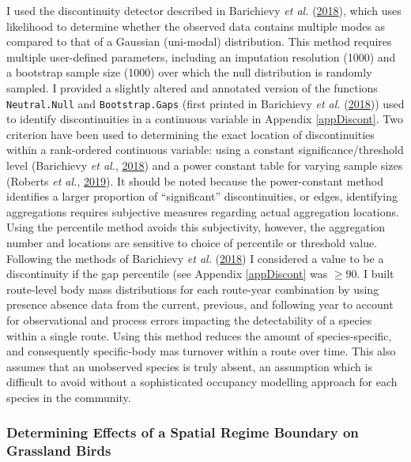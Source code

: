 \documentclass[print]{nuthesis}
\begin{document}
I used the discontinuity detector described in Barichievy \emph{et al.} (\protect\hyperlink{ref-barichievy2018method}{2018}), which uses likelihood to determine whether the observed data contains multiple modes as compared to that of a Gaussian (uni-modal) distribution. This method requires multiple user-defined parameters, including an imputation resolution (1000) and a bootstrap sample size (1000) over which the null distribution is randomly sampled. I provided a slightly altered and annotated version of the functions \texttt{Neutral.Null} and \texttt{Bootstrap.Gaps} (first printed in Barichievy \emph{et al.} (\protect\hyperlink{ref-barichievy2018method}{2018})) used to identify discontinuities in a continuous variable in Appendix \ref{appDiscont}.
Two criterion have been used to determining the exact location of discontinuities within a rank-ordered continuous variable: using a constant significance/threshold level (Barichievy \emph{et al.}, \protect\hyperlink{ref-barichievy2018method}{2018}) and a power constant table for varying sample sizes (Roberts \emph{et al.}, \protect\hyperlink{ref-roberts2019shifting}{2019}). It should be noted because the power-constant method identifies a larger proportion of ``significant'' discontinuities, or edges, identifying aggregations requires subjective measures regarding actual aggregation locations. Using the percentile method avoids this subjectivity, however, the aggregation number and locations are sensitive to choice of percentile or threshold value. Following the methods of Barichievy \emph{et al.} (\protect\hyperlink{ref-barichievy2018method}{2018}) I considered a value to be a discontinuity if the gap percentile (see Appendix \ref{appDiscont} was \(\geq 90%
\).
I built route-level body mass distributions for each route-year combination by using presence absence data from the current, previous, and following year to account for observational and process errors impacting the detectability of a species within a single route. Using this method reduces the amount of species-specific, and consequently specific-body mas turnover within a route over time. This also assumes that an unobserved species is truly absent, an assumption which is difficult to avoid without a sophisticated occupancy modelling approach for each species in the community.

\hypertarget{determining-effects-of-a-spatial-regime-boundary-on-grassland-birds}{%
\subsubsection{Determining Effects of a Spatial Regime Boundary on Grassland Birds}\label{determining-effects-of-a-spatial-regime-boundary-on-grassland-birds}}
\end{document}
